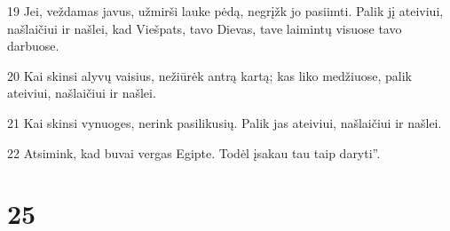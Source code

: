 \par 19 Jei, veždamas javus, užmirši lauke pėdą, negrįžk jo pasiimti. Palik jį ateiviui, našlaičiui ir našlei, kad Viešpats, tavo Dievas, tave laimintų visuose tavo darbuose. 
\par 20 Kai skinsi alyvų vaisius, nežiūrėk antrą kartą; kas liko medžiuose, palik ateiviui, našlaičiui ir našlei. 
\par 21 Kai skinsi vynuoges, nerink pasilikusių. Palik jas ateiviui, našlaičiui ir našlei. 
\par 22 Atsimink, kad buvai vergas Egipte. Todėl įsakau tau taip daryti”.



\chapter{25}



